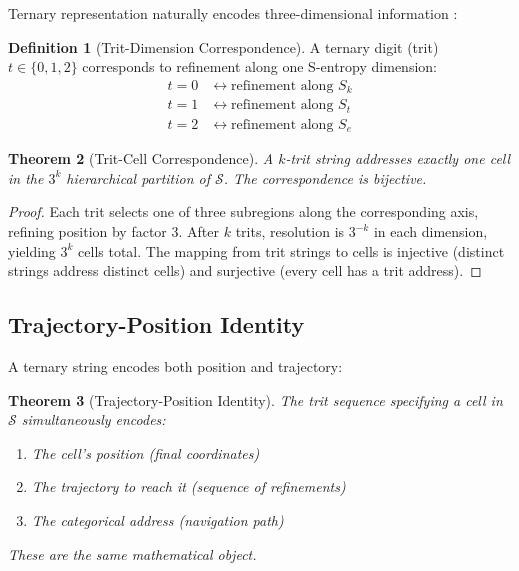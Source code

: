 \documentclass[10pt,twocolumn]{article}
\newtheorem{theorem}{Theorem}[section]
\theoremstyle{definition}
\newtheorem{definition}[theorem]{Definition}
\theoremstyle{remark}
\newcommand{\Sk}{S_k}
\newcommand{\St}{S_t}
\newcommand{\Se}{S_e}
\newcommand{\Sspace}{\mathcal{S}}
\begin{document}
Ternary representation naturally encodes three-dimensional information \cite{brusentsov1962,hayes2001}:

\begin{definition}[Trit-Dimension Correspondence]
A ternary digit (trit) $t \in \{0, 1, 2\}$ corresponds to refinement along one S-entropy dimension:
\begin{align}
t = 0 &\leftrightarrow \text{refinement along } \Sk \\
t = 1 &\leftrightarrow \text{refinement along } \St \\
t = 2 &\leftrightarrow \text{refinement along } \Se
\end{align}
\end{definition}

\begin{theorem}[Trit-Cell Correspondence]
A $k$-trit string addresses exactly one cell in the $3^k$ hierarchical partition of $\Sspace$. The correspondence is bijective.
\end{theorem}

\begin{proof}
Each trit selects one of three subregions along the corresponding axis, refining position by factor 3. After $k$ trits, resolution is $3^{-k}$ in each dimension, yielding $3^k$ cells total. The mapping from trit strings to cells is injective (distinct strings address distinct cells) and surjective (every cell has a trit address).
\end{proof}

\subsection{Trajectory-Position Identity}

A ternary string encodes both position and trajectory:

\begin{theorem}[Trajectory-Position Identity]
\label{thm:trajectory_position}
The trit sequence specifying a cell in $\Sspace$ simultaneously encodes:
\begin{enumerate}[nosep]
\item The cell's position (final coordinates)
\item The trajectory to reach it (sequence of refinements)
\item The categorical address (navigation path)
\end{enumerate}
These are the same mathematical object.
\end{theorem}
\end{document}
